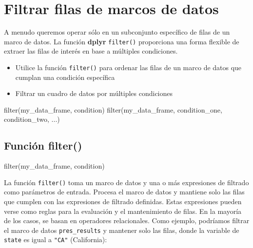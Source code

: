\documentclass[
]{book}
\newenvironment{Shaded}{\begin{snugshade}}{\end{snugshade}}
\newcommand{\FunctionTok}[1]{\textcolor[rgb]{0.00,0.00,0.00}{#1}}
\newcommand{\NormalTok}[1]{#1}
\providecommand{\tightlist}{%
  \setlength{\itemsep}{0pt}\setlength{\parskip}{0pt}}
\begin{document}
\hypertarget{filtrar-filas-de-marcos-de-datos}{%
\section{Filtrar filas de marcos de datos}\label{filtrar-filas-de-marcos-de-datos}}

A menudo queremos operar sólo en un subconjunto específico de filas de un marco de datos. La función \textbf{dplyr} \texttt{filter()} proporciona una forma flexible de extraer las filas de interés en base a múltiples condiciones.

\begin{itemize}
\tightlist
\item
  Utilice la función \texttt{filter()} para ordenar las filas de un marco de datos que cumplan una condición específica
\item
  Filtrar un cuadro de datos por múltiples condiciones
\end{itemize}

\begin{Shaded}
\begin{Highlighting}[]
\FunctionTok{filter}\NormalTok{(my\_data\_frame, condition)}
\FunctionTok{filter}\NormalTok{(my\_data\_frame, condition\_one, condition\_two, ...)}
\end{Highlighting}
\end{Shaded}

\hypertarget{funciuxf3n-filter}{%
\subsection{Función filter()}\label{funciuxf3n-filter}}

\begin{Shaded}
\begin{Highlighting}[]
\FunctionTok{filter}\NormalTok{(my\_data\_frame, condition)}
\end{Highlighting}
\end{Shaded}

La función \texttt{filter()} toma un marco de datos y una o más expresiones de filtrado como parámetros de entrada. Procesa el marco de datos y mantiene solo las filas que cumplen con las expresiones de filtrado definidas. Estas expresiones pueden verse como reglas para la evaluación y el mantenimiento de filas. En la mayoría de los casos, se basan en operadores relacionales. Como ejemplo, podríamos filtrar el marco de datos \texttt{pres\_results} y mantener solo las filas, donde la variable de \texttt{state} es igual a \texttt{"CA"} (California):
\end{document}
